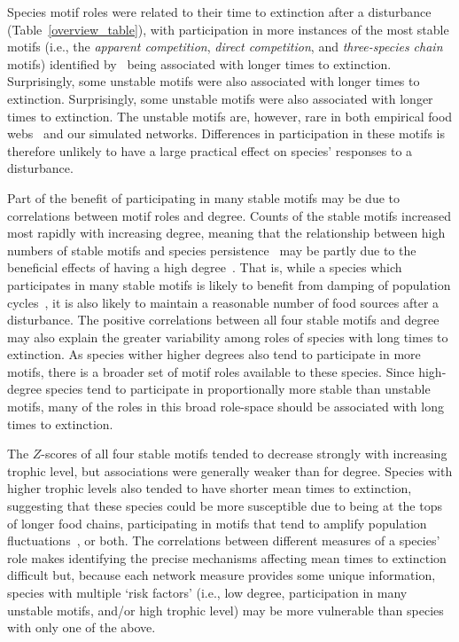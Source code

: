 \documentclass[12pt]{article}
\begin{document}
\begin{spacing}{2.0}
		Species motif roles were related to their time to extinction after a disturbance (Table~\ref{overview_table}), with participation in more instances of the most stable motifs (i.e., the \emph{apparent competition}, \emph{direct competition}, and \emph{three-species chain} motifs) identified by~\citet{Stouffer2007,Borrelli2015a} being associated with longer times to extinction. 
		Surprisingly, some unstable motifs were also associated with longer times to extinction.
        Surprisingly, some unstable motifs were also associated with longer times to extinction.
		The unstable motifs are, however, rare in both empirical food webs~\citep{Stouffer2007} and our simulated networks.
		Differences in participation in these motifs is therefore unlikely to have a large practical effect on species' responses to a disturbance.
        
        
        Part of the benefit of participating in many stable motifs may be due to correlations between motif roles and degree.
        Counts of the stable motifs increased most rapidly with increasing degree, meaning that the relationship between high numbers of stable motifs and species persistence~\citep{Stouffer2007,Borrelli2015a} may be partly due to the beneficial effects of having a high degree~\citep{Cirtwill2016a}.
		That is, while a species which participates in many stable motifs is likely to benefit from damping of population cycles~\citep{Borrelli2015a}, it is also likely to maintain a reasonable number of food sources after a disturbance.
		The positive correlations between all four stable motifs and degree may also explain the greater variability among roles of species with long times to extinction.
		As species wither higher degrees also tend to participate in more motifs, there is a broader set of motif roles available to these species.
		Since high-degree species tend to participate in proportionally more stable than unstable motifs, many of the roles in this broad role-space should be associated with long times to extinction.

		
        The $Z$-scores of all four stable motifs tended to decrease strongly with increasing trophic level, but associations were generally weaker than for degree.
        Species with higher trophic levels also tended to have shorter mean times to extinction, suggesting that these species could be more susceptible due to being at the tops of longer food chains, participating in motifs that tend to amplify population fluctuations~\citep{Borrelli2015a}, or both.
        The correlations between different measures of a species' role makes identifying the precise mechanisms affecting mean times to extinction difficult but, because each network measure provides some unique information, species with multiple `risk factors' (i.e., low degree, participation in many unstable motifs, and/or high trophic level) may be more vulnerable than species with only one of the above.


\end{spacing}
\end{document}

